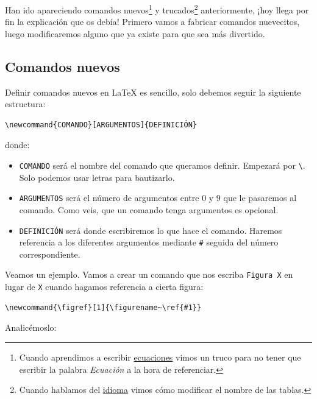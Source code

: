 Han ido apareciendo comandos nuevos\footnote{Cuando aprendimos a
  escribir
  \href{https://ondiz.github.io/cursoLatex/Contenido/05.Ecuaciones.html}{ecuaciones}
  vimos un truco para no tener que escribir la palabra \emph{Ecuación} a
  la hora de referenciar.} y trucados\footnote{Cuando hablamos del
  \href{https://ondiz.github.io/cursoLatex/Contenido/06.Idioma.html}{idioma}
  vimos cómo modificar el nombre de las tablas.} anteriormente, ¡hoy
llega por fin la explicación que os debía! Primero vamos a fabricar
comandos nuevecitos, luego modificaremos alguno que ya existe para que
sea más divertido.

\subsection{Comandos nuevos}

Definir comandos nuevos en LaTeX es sencillo, solo debemos seguir la
siguiente estructura:

\begin{lstlisting}[language={[latex]tex}]
\newcommand{COMANDO}[ARGUMENTOS]{DEFINICIÓN}
\end{lstlisting}

donde:

\begin{itemize}
\item
  \lstinline!COMANDO! será el nombre del comando que queramos definir.
  Empezará por \lstinline!\!. Solo podemos usar letras para bautizarlo.
\item
  \lstinline!ARGUMENTOS! será el número de argumentos entre 0 y 9 que le
  pasaremos al comando. Como veis, que un comando tenga argumentos es
  opcional.
\item
  \lstinline!DEFINICIÓN! será donde escribiremos lo que hace el comando.
  Haremos referencia a los diferentes argumentos mediante \lstinline!#!
  seguida del número correspondiente.
\end{itemize}

Veamos un ejemplo. Vamos a crear un comando que nos escriba
\lstinline!Figura X! en lugar de \lstinline!X! cuando hagamos referencia
a cierta figura:

\begin{lstlisting}[language={[latex]tex}]
\newcommand{\figref}[1]{\figurename~\ref{#1}}
\end{lstlisting}

Analicémoslo:

